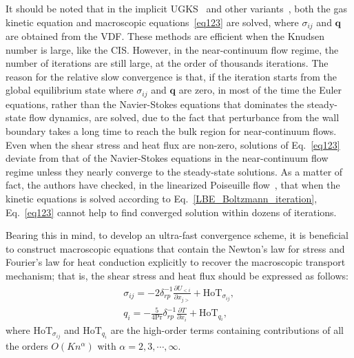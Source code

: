 It should be noted that in the implicit UGKS~\cite{Zhu2019JCP} and other variants~\cite{yang2018PoF,yang2018PRE}, both the gas kinetic equation and  macroscopic equations~\eqref{eq123} are solved, where $\sigma_{ij}$ and $\bm{q}$ are obtained from the VDF. These methods are efficient when the Knudsen number is large, like the CIS. However, in the near-continuum flow regime, the number of iterations are still large, at the order of thousands iterations. The reason for the relative slow convergence is that, if the iteration starts from the global equilibrium state where $\sigma_{ij}$ and $\bm{q}$ are zero, in most of the time the Euler equations, rather than the Navier-Stokes equations that dominates the steady-state flow dynamics, are solved, due to the fact that perturbance from the wall boundary takes a long time to reach the bulk region for near-continuum flows.	Even when the shear stress and heat flux are non-zero, solutions of Eq.~\eqref{eq123} deviate from that of the Navier-Stokes equations in the near-continuum flow regime unless they nearly converge to the steady-state solutions. As a matter of fact, the authors have checked, in the linearized Poiseuille flow~\cite{LeiJCP2017}, that when the kinetic equations is solved according to Eq.~\eqref{LBE_Boltzmann_iteration}, Eq.~\eqref{eq123} cannot help to find converged solution within dozens of iterations. 


Bearing this in mind, to develop an ultra-fast convergence scheme, it is beneficial to construct macroscopic equations that contain the Newton's law for stress and Fourier's law for heat conduction explicitly to recover the macroscopic transport mechanism; that is, the shear stress and heat flux should be expressed as follows:
\begin{eqnarray}\label{general_form}
\sigma_{ij} =-2\delta_{rp}^{-1}\frac{\partial U_{<i}}{\partial {x_{j>}}}+\text{HoT}_{\sigma_{ij}}, \label{sigma_HoT}\\
q_i =-\frac{5}{4\mathrm{Pr}}\delta_{rp}^{-1} \frac{\partial T}{\partial x_i}+\text{HoT}_{q_i}, \label{q_HoT}
\end{eqnarray}
where $\text{HoT}_{\sigma_{ij}}$ and $\text{HoT}_{q_i}$ are the high-order terms containing contributions of all the orders $O(Kn^\alpha)$ with $\alpha=2,3,\cdots,\infty$.


